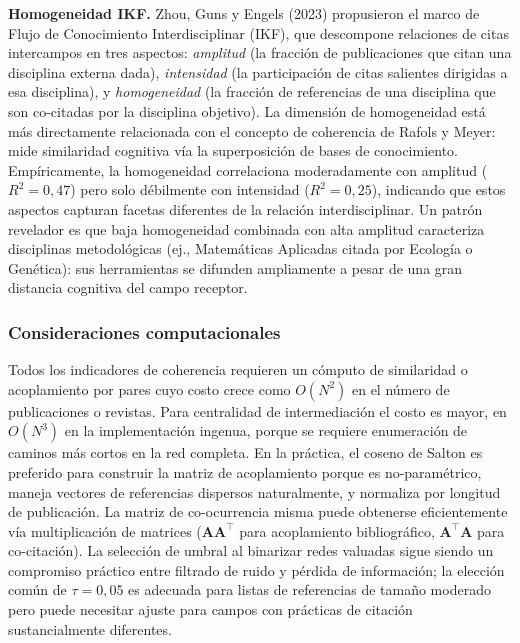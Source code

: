 \documentclass[
]{article}
\begin{document}
\textbf{Homogeneidad IKF.} Zhou, Guns y Engels (2023) propusieron el
marco de Flujo de Conocimiento Interdisciplinar (IKF), que descompone
relaciones de citas intercampos en tres aspectos: \emph{amplitud} (la
fracción de publicaciones que citan una disciplina externa dada),
\emph{intensidad} (la participación de citas salientes dirigidas a esa
disciplina), y \emph{homogeneidad} (la fracción de referencias de una
disciplina que son co-citadas por la disciplina objetivo). La dimensión
de homogeneidad está más directamente relacionada con el concepto de
coherencia de Rafols y Meyer: mide similaridad cognitiva vía la
superposición de bases de conocimiento. Empíricamente, la homogeneidad
correlaciona moderadamente con amplitud (\(R^2 = 0,47\)) pero solo
débilmente con intensidad (\(R^2 = 0,25\)), indicando que estos aspectos
capturan facetas diferentes de la relación interdisciplinar. Un patrón
revelador es que baja homogeneidad combinada con alta amplitud
caracteriza disciplinas metodológicas (ej., Matemáticas Aplicadas citada
por Ecología o Genética): sus herramientas se difunden ampliamente a
pesar de una gran distancia cognitiva del campo receptor.

\hypertarget{consideraciones-computacionales}{%
\subsubsection{Consideraciones
computacionales}\label{consideraciones-computacionales}}

Todos los indicadores de coherencia requieren un cómputo de similaridad
o acoplamiento por pares cuyo costo crece como \(O(N^2)\) en el número
de publicaciones o revistas. Para centralidad de intermediación el costo
es mayor, en \(O(N^3)\) en la implementación ingenua, porque se requiere
enumeración de caminos más cortos en la red completa. En la práctica, el
coseno de Salton es preferido para construir la matriz de acoplamiento
porque es no-paramétrico, maneja vectores de referencias dispersos
naturalmente, y normaliza por longitud de publicación. La matriz de
co-ocurrencia misma puede obtenerse eficientemente vía multiplicación de
matrices (\(\mathbf{A}\mathbf{A}^{\!\top}\) para acoplamiento
bibliográfico, \(\mathbf{A}^{\!\top}\mathbf{A}\) para co-citación). La
selección de umbral al binarizar redes valuadas sigue siendo un
compromiso práctico entre filtrado de ruido y pérdida de información; la
elección común de \(\tau = 0,05\) es adecuada para listas de referencias
de tamaño moderado pero puede necesitar ajuste para campos con prácticas
de citación sustancialmente diferentes.
\end{document}
